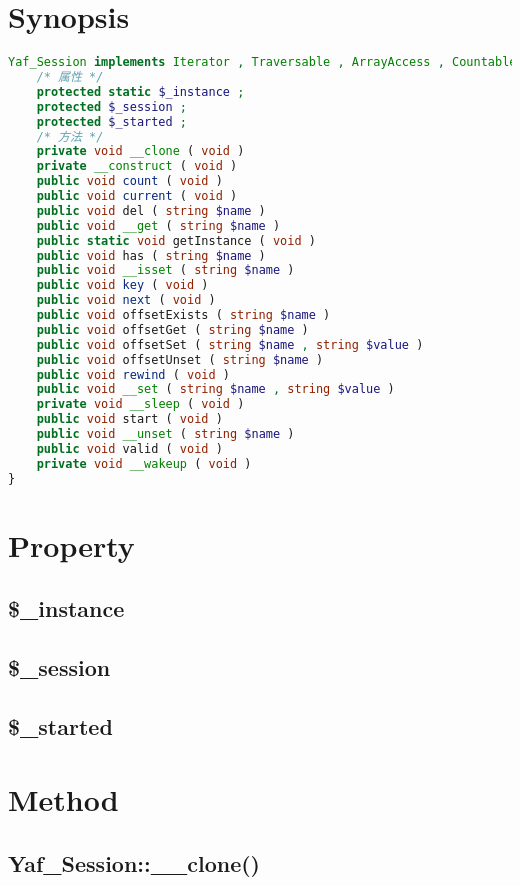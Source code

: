 \section{Synopsis}


\begin{lstlisting}[language=PHP]
Yaf_Session implements Iterator , Traversable , ArrayAccess , Countable {
    /* 属性 */
    protected static $_instance ;
    protected $_session ;
    protected $_started ;
    /* 方法 */
    private void __clone ( void )
    private __construct ( void )
    public void count ( void )
    public void current ( void )
    public void del ( string $name )
    public void __get ( string $name )
    public static void getInstance ( void )
    public void has ( string $name )
    public void __isset ( string $name )
    public void key ( void )
    public void next ( void )
    public void offsetExists ( string $name )
    public void offsetGet ( string $name )
    public void offsetSet ( string $name , string $value )
    public void offsetUnset ( string $name )
    public void rewind ( void )
    public void __set ( string $name , string $value )
    private void __sleep ( void )
    public void start ( void )
    public void __unset ( string $name )
    public void valid ( void )
    private void __wakeup ( void )
}
\end{lstlisting}

\section{Property}


\subsection{\$\_instance}


\subsection{\$\_session}


\subsection{\$\_started}


\section{Method}


\subsection{Yaf\_Session::\_\_clone()}




